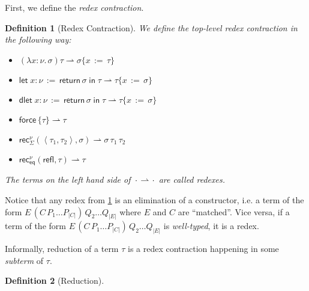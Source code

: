 \documentclass[a4,natbib=false]{article}
\newtheorem{definition}{Definition}
\newcommand{\fun}[2]{\lambda {#1}.\,{#2}}
\newcommand{\letname}{\mathsf{let}}
\newcommand{\dletname}{\mathsf{dlet}}
\newcommand{\letval}[3]{\letname\; {#1} \,:=\, {#2} \;\mathsf{in}\; {#3}}
\newcommand{\dletval}[3]{\dletname\; {#1} \,:=\, {#2} \;\mathsf{in}\; {#3}}
\newcommand{\pair}[2]{\left\langle{#1}, {#2}\right\rangle}
\newcommand{\refl}{\mathsf{refl}}
\newcommand{\force}[1]{\mathsf{force}\,{#1}}
\newcommand{\return}[1]{\mathsf{return}\,{#1}}
\newcommand{\thunk}[1]{\{{#1}\}}
\newcommand{\recsigmaname}{\mathsf{rec}_{\Sigma}}
\newcommand{\recsigma}[3]{\recsigmaname^{#2}({#1},{#3})}
\newcommand{\receqname}{\mathsf{rec}_{\mathsf{eq}}}
\newcommand{\receq}[3]{\receqname^{#2}({#1},{#3})}
\newcommand{\subst}[3]{{#1}\{{#2}\,:=\,{#3}\}}
\newcommand{\spcdot}{\mkern 2mu\cdot\mkern 2mu}
\newcommand{\reduces}[2]{{#1} \rightarrow {#2}}
\newcommand{\contracts}[2]{{#1} \rightharpoonup {#2}}
\newcommand{\narg}[1]{|{#1}|}
\newcommand{\arity}[1]{\mathsf{ar}{#1}}
\newcommand{\absclose}[2]{\vv{x}^{#1} #2}
\newcommand{\fullterm}[2]{{#1}\,#2_1 \dots #2_{\narg{#1}}}
\newcommand{\Infer}[3]{\inferrule*[right={#1}]{#2}{#3}}
\begin{document}
First, we define the \emph{redex contraction}.
\begin{definition}[Redex Contraction]
  \label{def:redex-contr}
  We define the top-level redex contraction in the following way:
  \begin{multicols}{2}
    \begin{itemize}

    \item $\contracts{(\fun{x:\nu}{\sigma})\tau}{\subst{\sigma}{x}{\tau}}$
      
    \item $\contracts{\letval{x:\nu}{\return{\sigma}}{\tau}}{\subst{\tau}{x}{\sigma}}$

    \item $\contracts{\dletval{x:\nu}{\return{\sigma}}{\tau}}{\subst{\tau}{x}{\sigma}}$

    \item $\contracts{\force{\thunk{\tau}}}{\tau}$

    \item $\contracts{\recsigma{\pair{\tau_1}{\tau_2}}{\nu}{\sigma}}{\sigma \,
        \tau_1 \, \tau_2}$

    \item $\contracts{\receq{\refl}{\nu}{\tau}}{\tau}$

    \end{itemize}
  \end{multicols}

  The terms on the left hand side of $\contracts{\spcdot}{\spcdot}$ are called \emph{redexes}.
  
\end{definition}

Notice that any redex from \cref{def:redex-contr} is an elimination of a
constructor, i.e. a term of the form $E\,(\fullterm{C}{P})\, Q_2 \dots
Q_{\narg{E}}$ where $E$ and $C$ are ``matched''.
Vice versa, if a term of the form
$E\,(\fullterm{C}{P})\, Q_2 \dots Q_{\narg{E}}$ is
\emph{well-typed}, it is a redex. 


Informally, reduction of a term $\tau$ is a redex contraction happening in some
\emph{subterm} of $\tau$.

\begin{definition}[Reduction]

\end{definition}
\end{document}
